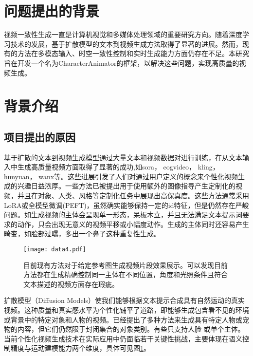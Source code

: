 \section{问题提出的背景}
视频一致性生成一直是计算机视觉和多媒体处理领域的重要研究方向。随着深度学习技术的发展，基于扩散模型的文本到视频生成方法取得了显著的进展。然而，现有的方法在多模态输入、时空一致性控制和实时生成能力方面仍存在不足。本研究旨在开发一个名为CharacterAnimator的框架，以解决这些问题，实现高质量的视频生成。

\section{背景介绍}

\subsection{项目提出的原因}
\par 基于扩散的文本到视频生成模型通过大量文本和视频数据对进行训练，在从文本输入中生成高质量视频方面取得了显著的成功,如sora， cogvideo， kling， hunyuan， wanx等\cite{liu2024sora,sun2024hunyuan, blattmann2023stable,singer2022make,blattmann2023align,yang2024cogvideox}。这些进展引发了人们对通过用户定义的概念来个性化视频生成的兴趣日益浓厚。一些方法已被提出用于使用额外的图像指导产生定制化的视频，并且在对象\cite{huang2025conceptmaster}、人类\cite{zhang2025magic}、风格\cite{huang2024style}等定制化任务中展现出高保真度。这些方法通常采用LoRA或全模型微调(PEFT)，虽然确实能够保持一定的id特征，但是仍然存在严峻问题。如生成视频的主体会呈现单一形态，呆板木立，并且无法满足文本提示词要求的动作，只会出现无意义的视频平移或小幅度动作。生成的主体同时还容易产生畸变，如脸部过曝，多出一个鼻子这种重复性生成。

\begin{figure}[htbp]
    \centering
    \texttt{[image: data4.pdf]}
    \caption{目前现有方法对于给定参考图生成视频片段效果展示。可以发现目前方法都在生成精确控制同一主体在不同位置，角度和光照条件且符合文本描述的视频方面存在瑕疵。}
    \label{fig:drawback}
  \end{figure}
\par 扩散模型（Diffusion Models）使我们能够根据文本提示合成具有自然运动的真实视频\cite{ho2020denoising,song2020denoising,esser2024scaling}。这种质量和真实感水平为个性化铺平了道路，即能够生成包含看不见的环境或背景中的特定对象和人物的视频。已经提出了多种方法来生成具有特定人物或宠物的内容，但它们仍然限于封闭集合的对象类别。有些只支持人脸\cite{ma2024magic,zhang2025magic} 或单个主体\cite{huang2024consistentid}。
当前个性化视频生成技术在实际应用中仍面临若干关键性挑战，主要体现在语义控制精度与运动建模能力两个维度，具体可见图\ref{fig:drawback}\cite{ruiz2023dreambooth,wei2024dreamvideo,kumari2023multi,chen2023videodreamer,blattmann2023stable}。

